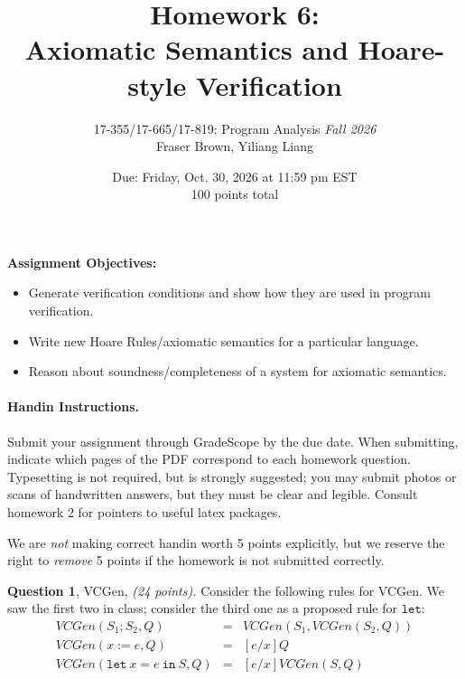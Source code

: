 \documentclass[11pt]{article}
\title{Homework 6: \\ Axiomatic Semantics and Hoare-style Verification}
\author{17-355/17-665/17-819: Program Analysis \emph{Fall 2026}\\
        Fraser Brown, Yiliang Liang\\}
\date{Due: Friday, Oct. 30, 2026 at 11:59 pm EST \\[1em]
100 points total
}
\newcommand{\question}[3]
  {\bigskip \noindent
  {\bf Question #1}, {#2}, {\it(#3 points).}}
\begin{document}
\newtheorem{theorem}{Theorem}
\newtheorem{lemma}[theorem]{Lemma}

\newcommand{\pfalse}{\mbox{false}}
\newcommand{\ptrue}{\mbox{true}}
\newcommand{\pand}{\mbox{and}}
\newcommand{\por}{\mbox{or}}
\newcommand{\pskip}{\mbox{skip}}
\newcommand{\pif}{\mbox{if}}
\newcommand{\pthen}{\mbox{then}}
\newcommand{\pelse}{\mbox{else}}
\newcommand{\pdo}{\mbox{do}}
\newcommand{\pwhile}{\mbox{while}}


\maketitle


\vspace{1ex}\noindent\textbf{Assignment Objectives:}

\begin{itemize}
\item Generate verification conditions and show how they are used in program verification. 
\item Write new Hoare Rules/axiomatic semantics for a particular language.
\item Reason about soundness/completeness of a system for axiomatic semantics.
\end{itemize}

\paragraph{Handin Instructions.} Submit your assignment through GradeScope by the due
date. When submitting, indicate which pages of the PDF correspond to each
homework question. 
Typesetting is not required, but is strongly suggested; you may submit photos or
scans of handwritten answers, but they must be clear and legible.  Consult homework 2
for pointers to useful latex packages.  

We are \emph{not} making correct handin
worth 5 points explicitly, but we reserve the right to \emph{remove} 5 points if the homework
is not submitted correctly. 


\question{1}{VCGen}{24}
Consider the following rules for VCGen.  We saw the first two in class; consider the third one as a proposed rule for $\mathtt{let}$: 
\[
\begin{array}{lcl}
  VCGen(S_1; S_2, Q) & = & VCGen(S_1, VCGen(S_2,Q)) \\
  VCGen(x := e, Q) & = & [ e/x] Q \\
  VCGen(\mathtt{let}~x=e~\mathtt{in}~S, Q) & = & [e/x] VCGen(S,Q)
\end{array}
\]
\end{document}

